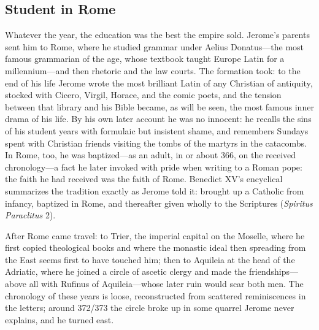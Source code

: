 \subsection{Student in Rome}

Whatever the year, the education was the best the empire sold. Jerome's
parents sent him to Rome, where he studied grammar under Aelius Donatus---the
most famous grammarian of the age, whose textbook taught Europe Latin for a
millennium---and then rhetoric and the law courts. The formation took: to the
end of his life Jerome wrote the most brilliant Latin of any Christian of
antiquity, stocked with Cicero, Virgil, Horace, and the comic poets, and the
tension between that library and his Bible became, as will be seen, the most
famous inner drama of his life. By his own later account he was no innocent:
he recalls the sins of his student years with formulaic but insistent shame,
and remembers Sundays spent with Christian friends visiting the tombs of the
martyrs in the catacombs. In Rome, too, he was baptized---as an adult, in or
about 366, on the received chronology---a fact he later invoked with pride
when writing to a Roman pope: the faith he had received was the faith of
Rome. Benedict XV's encyclical summarizes the tradition exactly as Jerome
told it: brought up a Catholic from infancy, baptized in Rome, and thereafter
given wholly to the Scriptures (\textit{Spiritus Paraclitus} 2).

After Rome came travel: to Trier, the imperial capital on the Moselle, where
he first copied theological books and where the monastic ideal then spreading
from the East seems first to have touched him; then to Aquileia at the head of
the Adriatic, where he joined a circle of ascetic clergy and made the
friendships---above all with Rufinus of Aquileia---whose later ruin would
scar both men. The chronology of these years is loose, reconstructed from
scattered reminiscences in the letters; around 372/373 the circle broke up in
some quarrel Jerome never explains, and he turned east.
